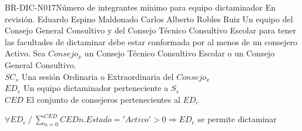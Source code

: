 \begin{BusinessRule}{BR-DIC-N017}{Número de integrantes mínimo para equipo dictaminador }
	{\bcCondition}    %
	{\btEnabler}     %
	{\blControlling}    %
	\BRItem[Estado] En revisión.
	 Eduardo Espino Maldonado
	 Carlos Alberto Robles Ruiz
	\BRItem[Descripción] Un equipo del Consejo General Consultivo y del Consejo Técnico Consultivo Escolar para tener las facultades de dictaminar debe estar conformada por al menos de un consejero Activo.
	\BRItem[Sentencia]
	Sea $Consejo_{x}$ un Consejo Técnico Consultivo Escolar o un Consejo General Consultivo.\\
      $SC_{s}$ Una sesión Ordinaria o Extraordinaria del $Consejo_{x}$\\
       $ED_{e}$ Un equipo dictaminador perteneciente a $S_{s}$ \\
	  $	CED$ El conjunto de  consejeros pertenecientes al $ED_{e}$ \\ 
	\begin{center}
		$ \forall  ED_{e} \: / \: \sum_{n=0}^{CED}CED{n}.{Estado='Activo'} > 0 \Rightarrow ED_{e} $ se permite dictaminar 
	\end{center}


\end{BusinessRule}
